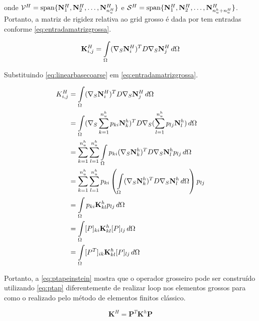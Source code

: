 onde $\trialcoarseaprox =  \text{span}\{ \basefunctioncoarse[1], \basefunctioncoarse[2], \hdots, \basefunctioncoarse[\qtdfreedomcoarse] \}$ e $\testcoarseaprox =  \text{span}\{ \basefunctioncoarse[1], \basefunctioncoarse[2], \hdots, \basefunctioncoarse[\qtdfreedomfine + \qtdfreedomcoarse] \}$. Portanto, a matriz de rigidez relativa ao grid grosso é dada por tem entradas conforme \eqref{eq:entradamatrizgrossa}.

\begin{equation} \label{eq:entradamatrizgrossa}
    \rigidmatrixcoarse_{i,j} =\omeint{(\sopnabla \basefunctioncoarse[i])^T D \sopnabla \basefunctioncoarse[j]}
\end{equation}

Substituindo \eqref{eq:linearbasecoarse} em \eqref{eq:entradamatrizgrossa}.


\begin{align}
     K^H_{i,j}  & =   \omeint{(\sopnabla \basefunctioncoarse[i])^T D \sopnabla \basefunctioncoarse[j]} \nonumber \\
                & =   \omeint{(\sopnabla  \sum_{k=1}^{\qtdfreedomfine} p_{ki} \basefunctionfine[k])^T D \sopnabla( \sum_{l=1}^{\qtdfreedomfine} p_{lj} \basefunctionfine[l] )}  \nonumber \\
                & =    \sum_{k=1}^{\qtdfreedomfine}  \sum_{l=1}^{\qtdfreedomfine} \omeint{p_{ki} ( \sopnabla \basefunctionfine[k])^T D \sopnabla \basefunctionfine[l] p_{lj}  }                  \nonumber \\
                & =    \sum_{k=1}^{\qtdfreedomfine}  \sum_{l=1}^{\qtdfreedomfine} p_{ki} \left( \omeint{ ( \sopnabla \basefunctionfine[k])^T D \sopnabla \basefunctionfine[l]   } \right)p_{lj}                            \nonumber \\
                & = \omeint{     p_{ki} \rigidmatrix_{kl} p_{lj}}  \nonumber \\
                & = \omeint{   [P]_{ki} \rigidmatrix_{kl} [P]_{lj}}                                         \nonumber \\
                & = \omeint{   [P^T]_{ik} \rigidmatrix_{kl} [P]_{lj}     }   \label{eq:ptapeinstein}  
\end{align}


Portanto, a \eqref{eq:ptapeinstein} mostra que o operador grosseiro pode ser construído utilizando \eqref{eq:ptap} diferentemente de realizar loop nos elementos grossos para como o realizado pelo método de elementos finitos clássico.

\begin{equation} \label{eq:ptap}
    \mathbf{K}^H = \mathbf{P}^T  \mathbf{K}^h \mathbf{P}
\end{equation}

